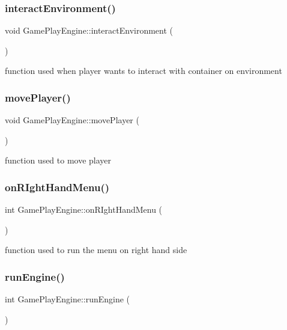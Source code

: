\subsubsection{\texorpdfstring{interact\+Environment()}{interactEnvironment()}}
{\footnotesize\ttfamily void Game\+Play\+Engine\+::interact\+Environment (\begin{DoxyParamCaption}{ }\end{DoxyParamCaption})}

function used when player wants to interact with container on environment \hypertarget{class_game_play_engine_a9070c110ca3fb2f66c8fd00aee968b75}{}\label{class_game_play_engine_a9070c110ca3fb2f66c8fd00aee968b75} 
\subsubsection{\texorpdfstring{move\+Player()}{movePlayer()}}
{\footnotesize\ttfamily void Game\+Play\+Engine\+::move\+Player (\begin{DoxyParamCaption}{ }\end{DoxyParamCaption})}

function used to move player \hypertarget{class_game_play_engine_a85db5a21ac09903aa84fc35378b273ea}{}\label{class_game_play_engine_a85db5a21ac09903aa84fc35378b273ea} 
\subsubsection{\texorpdfstring{on\+R\+Ight\+Hand\+Menu()}{onRIghtHandMenu()}}
{\footnotesize\ttfamily int Game\+Play\+Engine\+::on\+R\+Ight\+Hand\+Menu (\begin{DoxyParamCaption}{ }\end{DoxyParamCaption})}

function used to run the menu on right hand side \hypertarget{class_game_play_engine_a5c155091580329513e92d395b11d4940}{}\label{class_game_play_engine_a5c155091580329513e92d395b11d4940} 
\subsubsection{\texorpdfstring{run\+Engine()}{runEngine()}}
{\footnotesize\ttfamily int Game\+Play\+Engine\+::run\+Engine (\begin{DoxyParamCaption}{ }\end{DoxyParamCaption})}

